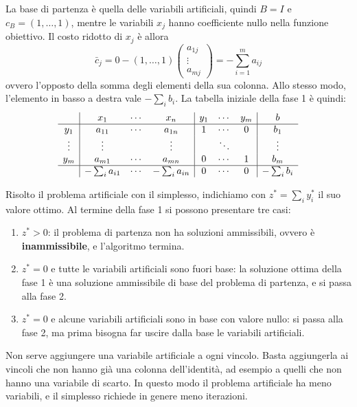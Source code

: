 La base di partenza è quella delle variabili artificiali, quindi $B = I$ e $c_B = (1, \dots, 1)$, mentre le variabili $x_j$ hanno coefficiente nullo nella funzione obiettivo. Il costo ridotto di $x_j$ è allora
\[
\bar{c}_j = 0 - (1, \dots, 1) \begin{pmatrix} a_{1j} \\ \vdots \\ a_{mj} \end{pmatrix} = -\sum_{i=1}^{m} a_{ij}
\]
ovvero l'opposto della somma degli elementi della sua colonna. Allo stesso modo, l'elemento in basso a destra vale $-\sum_i b_i$. La tabella iniziale della fase 1 è quindi:
\[
\begin{array}{c|ccc|ccc|c}
 & x_1 & \cdots & x_n & y_1 & \cdots & y_m & b \\
\hline
y_1 & a_{11} & \cdots & a_{1n} & 1 & \cdots & 0 & b_1 \\
\vdots & \vdots & & \vdots & & \ddots & & \vdots \\
y_m & a_{m1} & \cdots & a_{mn} & 0 & \cdots & 1 & b_m \\
\hline
 & -\sum_i a_{i1} & \cdots & -\sum_i a_{in} & 0 & \cdots & 0 & -\sum_i b_i
\end{array}
\]

Risolto il problema artificiale con il simplesso, indichiamo con $z^* = \sum_i y_i^*$ il suo valore ottimo. Al termine della fase 1 si possono presentare tre casi:
\begin{enumerate}
    \item $z^* > 0$: il problema di partenza non ha soluzioni ammissibili, ovvero è \textbf{inammissibile}, e l'algoritmo termina.
    \item $z^* = 0$ e tutte le variabili artificiali sono fuori base: la soluzione ottima della fase 1 è una soluzione ammissibile di base del problema di partenza, e si passa alla fase 2.
    \item $z^* = 0$ e alcune variabili artificiali sono in base con valore nullo: si passa alla fase 2, ma prima bisogna far uscire dalla base le variabili artificiali.
\end{enumerate}

\begin{osservazione}
Non serve aggiungere una variabile artificiale a ogni vincolo. Basta aggiungerla ai vincoli che non hanno già una colonna dell'identità, ad esempio a quelli che non hanno una variabile di scarto. In questo modo il problema artificiale ha meno variabili, e il simplesso richiede in genere meno iterazioni.
\end{osservazione}

